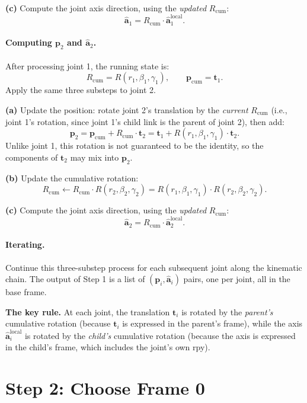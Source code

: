 \documentclass[11pt]{article}
\newcommand{\vect}[1]{\bm{#1}}
\newcommand{\unit}[1]{\hat{\bm{#1}}}
\begin{document}
\textbf{(c)} Compute the joint axis direction, using the \emph{updated}
$R_{\mathrm{cum}}$:
\[
  \unit{a}_1 = R_{\mathrm{cum}} \cdot \unit{a}_1^{\mathrm{local}}.
\]

\paragraph{Computing $\vect{p}_2$ and $\unit{a}_2$.} After processing joint 1,
the running state is:
\[
  R_{\mathrm{cum}} = R(r_1, \beta_1, \gamma_1), \qquad
  \vect{p}_{\mathrm{cum}} = \vect{t}_1.
\]
Apply the same three substeps to joint 2.

\textbf{(a)} Update the position: rotate joint 2's translation by the
\emph{current} $R_{\mathrm{cum}}$ (i.e., joint 1's rotation, since joint 1's
child link is the parent of joint 2), then add:
\[
  \vect{p}_2 = \vect{p}_{\mathrm{cum}} + R_{\mathrm{cum}} \cdot \vect{t}_2
             = \vect{t}_1 + R(r_1, \beta_1, \gamma_1) \cdot \vect{t}_2.
\]
Unlike joint 1, this rotation is not guaranteed to be the identity, so the
components of $\vect{t}_2$ may mix into $\vect{p}_2$.

\textbf{(b)} Update the cumulative rotation:
\[
  R_{\mathrm{cum}} \leftarrow R_{\mathrm{cum}} \cdot R(r_2, \beta_2, \gamma_2)
                            = R(r_1, \beta_1, \gamma_1) \cdot R(r_2, \beta_2, \gamma_2).
\]

\textbf{(c)} Compute the joint axis direction, using the \emph{updated}
$R_{\mathrm{cum}}$:
\[
  \unit{a}_2 = R_{\mathrm{cum}} \cdot \unit{a}_2^{\mathrm{local}}.
\]

\paragraph{Iterating.} Continue this three-substep process for each subsequent
joint along the kinematic chain. The output of Step 1 is a list of
$(\vect{p}_i, \unit{a}_i)$ pairs, one per joint, all in the base frame.

\begin{keybox}
\textbf{The key rule.} At each joint, the translation $\vect{t}_i$ is rotated
by the \emph{parent's} cumulative rotation (because $\vect{t}_i$ is expressed
in the parent's frame), while the axis $\unit{a}_i^{\mathrm{local}}$ is
rotated by the \emph{child's} cumulative rotation (because the axis is
expressed in the child's frame, which includes the joint's own rpy).
\end{keybox}

\section{Step 2: Choose Frame 0}
\end{document}
